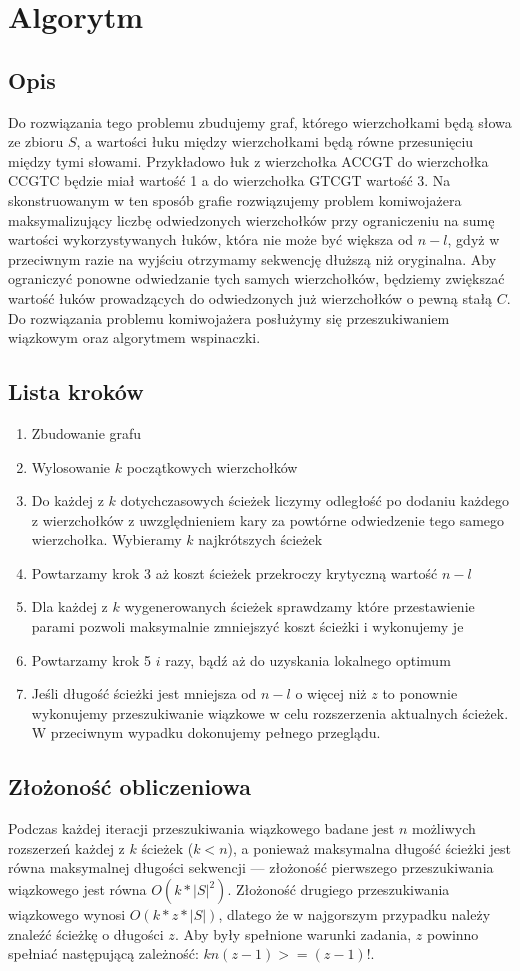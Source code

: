 \documentclass{article}
\begin{document}
\section{Algorytm}
\subsection{Opis}
Do rozwiązania tego problemu zbudujemy graf, którego wierzchołkami będą słowa ze zbioru $S$, a wartości łuku między wierzchołkami będą równe przesunięciu między tymi słowami. Przykładowo łuk z wierzchołka ACCGT do wierzchołka CCGTC będzie miał wartość 1 a do wierzchołka GTCGT wartość 3. Na skonstruowanym w ten sposób grafie rozwiązujemy problem komiwojażera maksymalizujący liczbę odwiedzonych wierzchołków przy ograniczeniu na sumę wartości wykorzystywanych łuków, która nie może być większa od $n - l$, gdyż w przeciwnym razie na wyjściu otrzymamy sekwencję dłuższą niż oryginalna.
Aby ograniczyć ponowne odwiedzanie tych samych wierzchołków, będziemy zwiększać wartość łuków prowadzących do odwiedzonych już wierzchołków o pewną stałą $C$.
Do rozwiązania problemu komiwojażera posłużymy się przeszukiwaniem wiązkowym oraz algorytmem wspinaczki.
\subsection{Lista kroków}
\begin{enumerate}
    \item Zbudowanie grafu
    \item Wylosowanie $k$ początkowych wierzchołków
    \item Do każdej z $k$ dotychczasowych ścieżek liczymy odległość po dodaniu każdego z wierzchołków z uwzględnieniem kary za powtórne odwiedzenie tego samego wierzchołka. Wybieramy $k$ najkrótszych ścieżek
    \item Powtarzamy krok 3 aż koszt ścieżek przekroczy krytyczną wartość $n-l$
    \item Dla każdej z $k$ wygenerowanych ścieżek sprawdzamy które przestawienie parami pozwoli maksymalnie zmniejszyć koszt ścieżki i wykonujemy je
    \item Powtarzamy krok 5 $i$ razy, bądź aż do uzyskania lokalnego optimum
    \item Jeśli długość ścieżki jest mniejsza od $n-l$ o więcej niż $z$ to ponownie wykonujemy przeszukiwanie wiązkowe w celu rozszerzenia aktualnych ścieżek. W przeciwnym wypadku dokonujemy pełnego przeglądu.
\end{enumerate}
\subsection{Złożoność obliczeniowa}
Podczas każdej iteracji przeszukiwania wiązkowego badane jest $n$ możliwych rozszerzeń każdej z $k$ ścieżek ($k<n$), a ponieważ maksymalna długość ścieżki jest równa maksymalnej długości sekwencji --- złożoność pierwszego przeszukiwania wiązkowego jest równa $O(k*|S|^2)$. Złożoność drugiego przeszukiwania wiązkowego wynosi $O(k*z*|S|)$, dlatego że w najgorszym przypadku należy znaleźć ścieżkę o długości $z$. Aby były spełnione warunki zadania, $z$ powinno spełniać następującą zależność: $kn(z-1)>=(z-1)!$.
\end{document}
